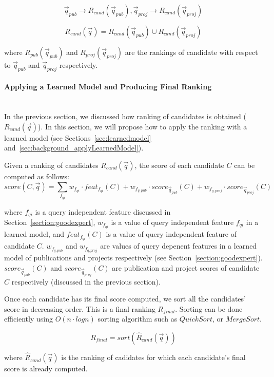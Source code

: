 \begin{equation}
 \vec{q}_{pub} \rightarrow R_{cand}(\vec{q}_{pub}),  \vec{q}_{proj} \rightarrow R_{cand}(\vec{q}_{proj})
\end{equation}

\begin{equation}
 R_{cand}(\vec{q}) = R_{cand}(\vec{q}_{pub})\cup R_{cand}(\vec{q}_{proj})
\end{equation}

where $R_{pub}(\vec{q}_{pub})$ and $R_{proj}(\vec{q}_{proj})$ are the rankings of candidate with respect to $\vec{q}_{pub}$ and $\vec{q}_{proj}$
respectively.

\paragraph{Applying a Learned Model and Producing Final Ranking} \hspace{0pt} \\
In the previous section, we discussed how ranking of candidates is obtained ($R_{cand}(\vec{q})$). In this section, we will propose how to apply the ranking
with a learned model (see Sections~\ref{sec:learnedmodel} and~\ref{sec:background_applyLearnedModel}). 

Given a ranking of candidates $R_{cand}(\vec{q})$, the score of each candidate $C$ can be computed as follows:
\begin{equation}
 score(C, \vec{q}) = \sum_{f_{qi}} w_{f_{qi}}\cdot feat_{f_{qi}}(C) + w_{f_{q,pub}}\cdot score_{\vec{q}_{pub}}(C) + 
 w_{f_{q,proj}}\cdot score_{\vec{q}_{proj}}(C)
\end{equation}

where $f_{qi}$ is a query independent feature discussed in Section~\ref{section:goodexpert}, $w_{f_{qi}}$ is a value of 
query independent feature ${f_{qi}}$ in a learned model, and $feat_{f_{qi}}(C)$ is a value of query independent feature of candidate $C$.
$w_{f_{q,pub}}$ and $w_{f_{q,proj}}$ are values of query depenent features in a learned model of publications and projects respectively (see Section~\ref{section:goodexpert}).
$score_{\vec{q}_{pub}}(C)$ and $score_{\vec{q}_{proj}}(C)$ are publication and project scores of candidate $C$ respectively (discussed in the previous section).

Once each candidate has its final score computed, we sort all the candidates' score in decreasing order. This is a final ranking $R_{final}$. Sorting
can be done efficiently using $O(n\cdot log n)$ sorting algorithm such as $Quick Sort$, or $Merge Sort$.

\begin{equation}
 R_{final} = sort(\hat{R}_{cand}(\vec{q}))
\end{equation}

where $\hat{R}_{cand}(\vec{q})$ is the ranking of cadidates for which each candidate's final score is already computed.





